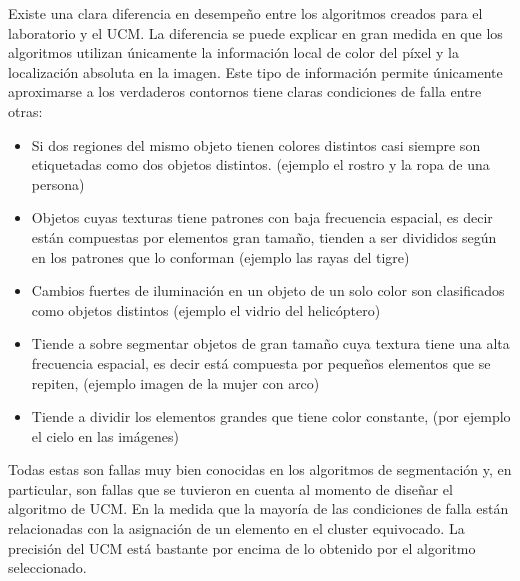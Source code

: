 \documentclass[10pt,twocolumn,letterpaper]{article}
\begin{document}
Existe una clara diferencia en desempeño entre los algoritmos creados para el laboratorio y el UCM. La diferencia se puede explicar en gran medida en que los algoritmos utilizan únicamente la información local de color del píxel y la localización absoluta en la imagen. Este tipo de información permite únicamente aproximarse a los verdaderos contornos  tiene claras condiciones de falla entre otras:
\begin{itemize}
\item Si dos regiones del mismo objeto tienen  colores distintos casi siempre son etiquetadas como dos objetos distintos. (ejemplo el rostro y la ropa de una persona)
\item  Objetos cuyas texturas tiene patrones con baja frecuencia espacial, es decir están compuestas por elementos gran tamaño, tienden a ser divididos según en los patrones que lo conforman (ejemplo las rayas del tigre)
\item Cambios fuertes de iluminación en un objeto de un solo color son clasificados como objetos distintos  (ejemplo el vidrio del helicóptero)
\item Tiende a sobre segmentar objetos de gran tamaño cuya textura tiene una alta frecuencia espacial, es decir está compuesta por pequeños elementos que se repiten, (ejemplo imagen de la mujer con arco)
\item Tiende a dividir los elementos grandes que tiene color constante, (por ejemplo el cielo en las imágenes)

\end{itemize}
Todas estas son fallas muy bien conocidas en los algoritmos de segmentación y, en particular, son fallas que se tuvieron en cuenta al momento de diseñar el algoritmo de UCM. 
En la medida que la mayoría de las condiciones de falla están relacionadas con la asignación de un elemento en el cluster equivocado. La precisión del UCM está bastante por encima de lo obtenido por el algoritmo seleccionado.
\end{document}
